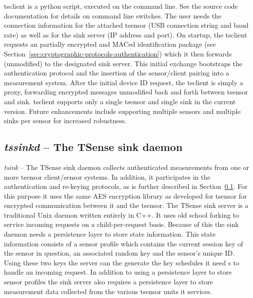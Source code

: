 tsclient is a python script, executed on the command line. See the source code documentation for details on command line switches. The user needs the connection information for the attached tsensor (USB connection string and baud rate) as well as for the sink server (IP address and port). On startup, the tsclient requests an partially encrypted and MACed identification package (see Section~\ref{sec:cryptographic-protocols-authentication}) which it then forwards (unmodified) to the designated sink server. This initial exchange bootstraps the authentication protocol and the insertion of the sensor/client pairing into a measurement system. After the initial device ID request, the tsclient is simply a proxy, forwarding encrypted messages unmodified back and forth between tsensor and sink. tsclient supports only a single tsensor and single sink in the current version. Future enhancements include supporting multiple sensors and multiple sinks per sensor for increased robustness.

\subsection{\textit{tssinkd} -- The TSense sink daemon}

\textit{tsink} -- The TSense sink daemon collects authenticated measurements from one or more tsensor client/sensor systems. In addition, it participates in the authentication and re-keying protocols, as is further described in Section~\ref{}.  For this purpose it uses the same AES encryption library as developed for tsensor for  encrypted communication between it and the tsensor.  The TSense sink server is a traditional Unix daemon written entirely in C++. It uses old school forking to service incoming requests on a child-per-request basis. Because of this the sink daemon needs a persistence layer to store state information. This state information consists of a sensor profile which contains the current session key of the sensor in question, an associated random key and the sensor's unique ID. Using these two keys the server can the generate the key schedules it need s to handle an incoming request. In addition to using a persistence layer to store sensor profiles the sink server  also requires a persistence layer to store measurement data collected from the various tsensor units it services.\\


